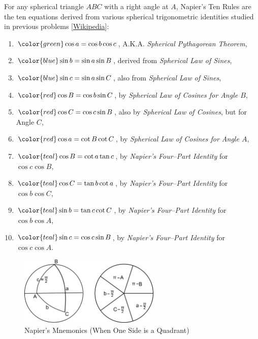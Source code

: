 \documentclass[12pt,a4paper]{memoir}
\theoremstyle{definition}
\begin{document}
	\begin{question}[name={Napier's Ten Commandments}]
		For any spherical triangle $ABC$ with a right angle at $A$, Napier's Ten Rules are the ten equations derived from various spherical trigonometric identities studied in previous problems [\href{https://commons.wikimedia.org/wiki/File:Spherical_trigonometry_Napier_quadrantal_01.svg}{Wikipedia}]:
		\begin{enumerate}
			\item[\color{green}(I)] $\color{green} \cos a = \cos b \cos c$, A.K.A. \textit{\color{green} Spherical Pythagorean Theorem},
			\item[\color{blue}(II)] $\color{blue} \sin b = \sin a \sin B$, derived from \textit{Spherical Law of Sines},
			\item[\color{blue}(III)] $\color{blue} \sin c = \sin a \sin C$, also from \textit{Spherical Law of Sines},
			\item[\color{red}(IV)] $\color{red} \cos B = \cos b \sin C$, by \textit{Spherical Law of Cosines for Angle $B$},
			\item[\color{red}(V)] $\color{red} \cos C = \cos c \sin B$, also by \textit{Spherical Law of Cosines}, but for Angle $C$,
			\item[\color{red}(VI)] $\color{red} \cos a = \cot B \cot C$, by \textit{Spherical Law of Cosines for Angle $A$},
			\item[\color{teal}(VII)] $\color{teal} \cos B = \cot a \tan c$, by \textit{Napier's Four--Part Identity} for $\cos c \cos B$,
			\item[\color{teal}(VIII)]$\color{teal} \cos C = \tan b \cot a$, by \textit{Napier's Four--Part Identity} for $\cos b \cos C$,
			\item[\color{teal}(IX)]  $\color{teal} \sin b = \tan c \cot C$, by \textit{Napier's Four--Part Identity} for $\cos b \cos A$,
			\item[\color{teal}(X)] $\color{teal} \sin c = \cos c \sin B$, by \textit{Napier's Four--Part Identity} for $\cos c \cos A$.
		\end{enumerate}
	\end{question}
	

\begin{figure}[H]
	\centering
	\includegraphics[width=0.6\textwidth]{IMG/Napier2.png}
	\caption{Napier's Mnemonics (When One Side is a Quadrant)}
	\label{fig:napierfive2}
\end{figure}
	
\end{document}
